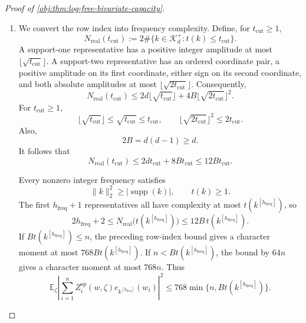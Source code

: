 \begin{proof}[Proof of \cref{obj:thm:log-free-bivariate-capacity}]
\begin{enumerate}
The two real rows associated with \(k^{[h_{\mathrm{freq}}]}\) satisfy the pointwise identity
\[
\left|
\sum_{i=1}^n
Z_i^{\mathrm{sp}}(w,\zeta)
e_{k^{[h_{\mathrm{freq}}]}}(w_i)
\right|^2
=
\frac{
\bigl(a_{2h_{\mathrm{freq}}+1}(w)^{\mathsf T}Z^{\mathrm{sp}}(w,\zeta)\bigr)^2
+
\bigl(a_{2h_{\mathrm{freq}}+2}(w)^{\mathsf T}Z^{\mathrm{sp}}(w,\zeta)\bigr)^2
}{2}.
\]
Indeed, the row imbalances are \(\sqrt2\) times the real and imaginary parts of the character imbalance. Taking expectations therefore gives
\[
\mathbb E_\zeta
\left|
\sum_{i=1}^n
Z_i^{\mathrm{sp}}(w,\zeta)
e_{k^{[h_{\mathrm{freq}}]}}(w_i)
\right|^2
\leq64\min\{2h_{\mathrm{freq}}+2,n\}.
\]

\item
We convert the row index into frequency complexity. Define, for \(t_{\mathrm{cut}}\geq1\),
\[
N_{\mathrm{real}}(t_{\mathrm{cut}})
:=
2\#\{k\in\mathscr K_d^+:t(k)\leq t_{\mathrm{cut}}\}.
\]
A support-one representative has a positive integer amplitude at most
\(\lfloor\sqrt{t_{\mathrm{cut}}}\rfloor\). A support-two representative has an ordered coordinate pair, a positive amplitude on its first coordinate, either sign on its second coordinate, and both absolute amplitudes at most
\(\lfloor\sqrt{2t_{\mathrm{cut}}}\rfloor\). Consequently,
\[
N_{\mathrm{real}}(t_{\mathrm{cut}})
\leq
2d\lfloor\sqrt{t_{\mathrm{cut}}}\rfloor
+
4B\lfloor\sqrt{2t_{\mathrm{cut}}}\rfloor^2.
\]
For \(t_{\mathrm{cut}}\geq1\),
\[
\lfloor\sqrt{t_{\mathrm{cut}}}\rfloor
\leq\sqrt{t_{\mathrm{cut}}}\leq t_{\mathrm{cut}},
\qquad
\lfloor\sqrt{2t_{\mathrm{cut}}}\rfloor^2
\leq2t_{\mathrm{cut}}.
\]
Also,
\[
2B=d(d-1)\geq d.
\]
It follows that
\[
N_{\mathrm{real}}(t_{\mathrm{cut}})
\leq2dt_{\mathrm{cut}}+8Bt_{\mathrm{cut}}
\leq12Bt_{\mathrm{cut}}.
\]

Every nonzero integer frequency satisfies
\[
\|k\|_2^2\geq|\operatorname{supp}(k)|,
\qquad t(k)\geq1.
\]
The first \(h_{\mathrm{freq}}+1\) representatives all have complexity at most
\(t(k^{[h_{\mathrm{freq}}]})\), so
\[
2h_{\mathrm{freq}}+2
\leq
N_{\mathrm{real}}\bigl(t(k^{[h_{\mathrm{freq}}]})\bigr)
\leq12B\,t(k^{[h_{\mathrm{freq}}]}).
\]
If \(Bt(k^{[h_{\mathrm{freq}}]})\leq n\), the preceding row-index bound gives a character moment at most \(768Bt(k^{[h_{\mathrm{freq}}]})\). If
\(n<Bt(k^{[h_{\mathrm{freq}}]})\), the bound by \(64n\) gives a character moment at most \(768n\). Thus
\[
\mathbb E_\zeta
\left|
\sum_{i=1}^n
Z_i^{\mathrm{sp}}(w,\zeta)
e_{k^{[h_{\mathrm{freq}}]}}(w_i)
\right|^2
\leq
768\min\{n,Bt(k^{[h_{\mathrm{freq}}]})\}.
\]


\end{enumerate}
\end{proof}

